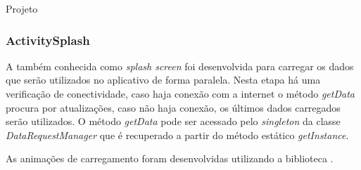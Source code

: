 \documentclass[
	12pt,				%
	openright,			%
	twoside,			%
	a4paper,			%
	english,			%
	french,				%
	spanish,			%
	brazil				%
	]{abntex2}
\begin{document}
\begin{chapter}{Projeto}
\subsubsection{ActivitySplash} \label{splash_activity}
A  também conhecida como \textit{splash screen} foi desenvolvida para carregar os dados que serão utilizados no aplicativo de forma paralela. Nesta etapa há uma verificação de conectividade, caso haja conexão com a internet o método \textit{getData} procura por atualizações, caso não haja conexão, os últimos dados carregados serão utilizados. O método \textit{getData} pode ser acessado pelo \textit{singleton} da classe \textit{DataRequestManager} que é recuperado a partir do método estático \textit{getInstance}. 

As animações de carregamento foram desenvolvidas utilizando a biblioteca .


\end{chapter}
\end{document}
